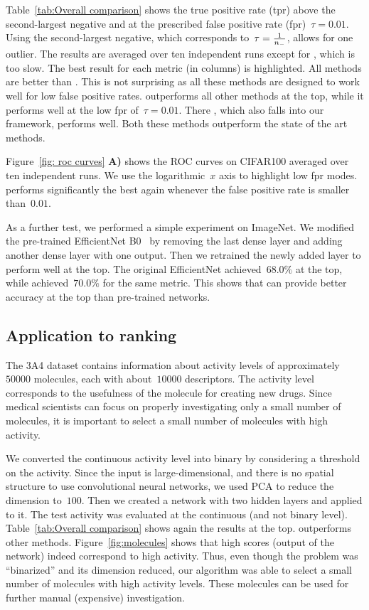 Table~\ref{tab:Overall comparison} shows the true positive rate (tpr) above the second-largest negative and at the prescribed false positive rate (fpr)~$\tau=0.01$. Using the second-largest negative, which corresponds to~$\tau=\frac{1}{n_{-}}$, allows for one outlier. The results are averaged over ten independent runs except for \APPerf, which is too slow. The best result for each metric (in columns) is highlighted. All methods are better than \BaseLine. This is not surprising as all these methods are designed to work well for low false positive rates. \DeepTopPush outperforms all other methods at the top, while it performs well at the low fpr of~$\tau=0.01$. There \PatMatNP, which also falls into our framework, performs well. Both these methods outperform the state of the art methods. 

Figure~\ref{fig: roc curves} \textbf{A)} shows the ROC curves on CIFAR100 averaged over ten independent runs. We use the logarithmic~$x$ axis to highlight low fpr modes. \DeepTopPush performs significantly the best again whenever the false positive rate is smaller than~$0.01$.

As a further test, we performed a simple experiment on ImageNet. We modified the pre-trained EfficientNet B0~\cite{tan2019efficientnet} by removing the last dense layer and adding another dense layer with one output. Then we retrained the newly added layer to perform well at the top. The original EfficientNet achieved~$68.0\%$ at the top, while \DeepTopPush achieved~$70.0\%$ for the same metric. This shows that \DeepTopPush can provide better accuracy at the top than pre-trained networks.

\subsection{Application to ranking}

The 3A4 dataset contains information about activity levels of approximately~$50000$ molecules, each with about~$10000$ descriptors. The activity level corresponds to the usefulness of the molecule for creating new drugs. Since medical scientists can focus on properly investigating only a small number of molecules, it is important to select a small number of molecules with high activity.

We converted the continuous activity level into binary by considering a threshold on the activity. Since the input is large-dimensional, and there is no spatial structure to use convolutional neural networks, we used PCA to reduce the dimension to~$100$. Then we created a network with two hidden layers and applied \DeepTopPush to it. The test activity was evaluated at the continuous (and not binary level). Table~\ref{tab:Overall comparison} shows again the results at the top. \DeepTopPush outperforms other methods. Figure~\ref{fig:molecules} shows that high scores (output of the network) indeed correspond to high activity. Thus, even though the problem was ``binarized'' and its dimension reduced, our algorithm was able to select a small number of molecules with high activity levels. These molecules can be used for further manual (expensive) investigation.

